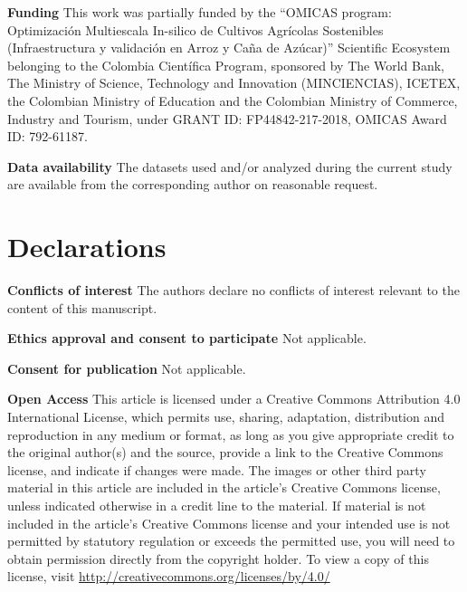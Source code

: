 \documentclass[referee,pdflatex,sn-basic]{sn-jnl}%
\theoremstyle{thmstyleone}%
\theoremstyle{thmstyletwo}%
\theoremstyle{thmstylethree}%
\begin{document}
\textbf{Funding}
This work was partially funded by the ``OMICAS program:
Optimización Multiescala In-silico de Cultivos Agrícolas 
Sostenibles (Infraestructura y validación en Arroz y Caña de 
Azúcar)'' Scientific Ecosystem belonging to the Colombia 
Científica Program, sponsored by The World Bank, The 
Ministry of Science, Technology and Innovation (MINCIENCIAS), 
ICETEX, the Colombian Ministry of Education and the Colombian 
Ministry of Commerce, Industry and Tourism, under GRANT ID: 
FP44842-217-2018, OMICAS Award ID: 792-61187.

\textbf{Data availability}
The datasets used and/or analyzed during 
the current study are available from the corresponding author on 
reasonable request.


\section*{Declarations}

\textbf{Conflicts of interest}
The authors declare no conflicts of interest relevant to the content 
of this manuscript.

\textbf{Ethics approval and consent to participate}
Not applicable.

\textbf{Consent for publication}
Not applicable.

\textbf{Open Access}
This article is licensed under a Creative Commons 
Attribution 4.0 International License, which permits use, sharing, 
adaptation, distribution and reproduction in any medium or format, as long
as you give appropriate credit to the original author(s) and the source,
provide a link to the Creative Commons license, and indicate if changes
were made. The images or other third party material in this article are
included in the article's Creative Commons license, unless indicated
otherwise in a credit line to the material. If material is not included 
in the article's Creative Commons license and your intended use is not
permitted by statutory regulation or exceeds the permitted use, you will
need to obtain permission directly from the copyright holder. To view a
copy of this license, visit \url{http://creativecommons.org/licenses/by/4.0/}



\end{document}
